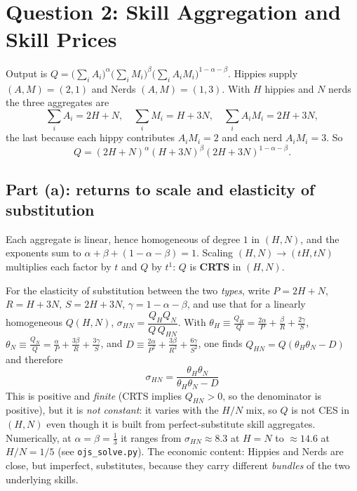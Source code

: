 \documentclass[11pt]{article}
\begin{document}
\section*{Question 2: Skill Aggregation and Skill Prices}

Output is
$Q=\bigl(\sum_i A_i\bigr)^{\alpha}\bigl(\sum_i M_i\bigr)^{\beta}
   \bigl(\sum_i A_iM_i\bigr)^{1-\alpha-\beta}$.
Hippies supply $(A,M)=(2,1)$ and Nerds $(A,M)=(1,3)$. With $H$ hippies and $N$
nerds the three aggregates are
\[
\textstyle\sum_iA_i=2H+N,\quad \sum_iM_i=H+3N,\quad
\sum_iA_iM_i=2H+3N,
\]
the last because each hippy contributes $A_iM_i=2$ and each nerd $A_iM_i=3$. So
\begin{equation}
Q=(2H+N)^{\alpha}(H+3N)^{\beta}(2H+3N)^{1-\alpha-\beta}.
\end{equation}

\subsection*{Part (a): returns to scale and elasticity of substitution}

Each aggregate is linear, hence homogeneous of degree $1$ in $(H,N)$, and the
exponents sum to $\alpha+\beta+(1-\alpha-\beta)=1$. Scaling $(H,N)\rightarrow(tH,tN)$
multiplies each factor by $t$ and $Q$ by $t^{1}$: $Q$ is \textbf{CRTS} in
$(H,N)$.

For the elasticity of substitution between the two \emph{types}, write
$P=2H+N$, $R=H+3N$, $S=2H+3N$, $\gamma=1-\alpha-\beta$, and use that for a
linearly homogeneous $Q(H,N)$,
$\sigma_{HN}=\dfrac{Q_HQ_N}{Q\,Q_{HN}}$. With
$\theta_H\equiv\tfrac{Q_H}{Q}=\tfrac{2\alpha}{P}+\tfrac{\beta}{R}+\tfrac{2\gamma}{S}$,
$\theta_N\equiv\tfrac{Q_N}{Q}=\tfrac{\alpha}{P}+\tfrac{3\beta}{R}+\tfrac{3\gamma}{S}$,
and $D\equiv\tfrac{2\alpha}{P^2}+\tfrac{3\beta}{R^2}+\tfrac{6\gamma}{S^2}$, one
finds $Q_{HN}=Q(\theta_H\theta_N-D)$ and therefore
\begin{equation}
\boxed{\;\sigma_{HN}=\frac{\theta_H\theta_N}{\theta_H\theta_N-D}\;}
\end{equation}
This is positive and \emph{finite} (CRTS implies $Q_{HN}>0$, so the denominator
is positive), but it is \emph{not constant}: it varies with the $H/N$ mix, so
$Q$ is not CES in $(H,N)$ even though it is built from perfect-substitute skill
aggregates. Numerically, at $\alpha=\beta=\tfrac13$ it ranges from
$\sigma_{HN}\approx8.3$ at $H=N$ to $\approx14.6$ at $H/N=1/5$ (see
\texttt{ojs\_solve.py}). The economic content: Hippies and Nerds are close, but
imperfect, substitutes, because they carry different \emph{bundles} of the two
underlying skills.
\end{document}
